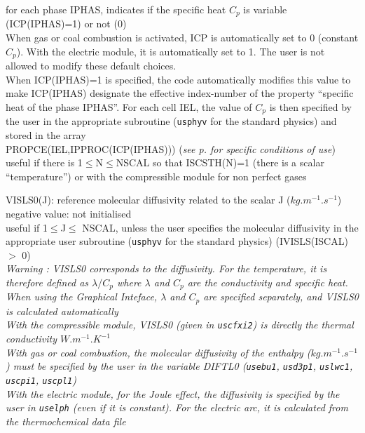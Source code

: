 {for each phase IPHAS, indicates if the specific heat $C_p$ is variable
(ICP(IPHAS)=1) or not (0)\\
When gas or coal combustion is activated, ICP is automatically set to 0
(constant $C_p$). With the electric module, it is automatically set to 1.
The user is not allowed to modify these default choices.\\
When ICP(IPHAS)=1 is specified, the code automatically modifies this value to
make ICP(IPHAS) designate the effective index-number of the property
``specific heat of the phase IPHAS''. For each cell IEL, the value of
$C_p$ is then specified by the user in the appropriate subroutine
(\texttt{usphyv} for the standard physics) and stored in the array\\
PROPCE(IEL,IPPROC(ICP(IPHAS)))
({\em see p.\pageref{prg_propvar} for specific conditions of use})\\
useful if there is 1$\leqslant$N$\leqslant$NSCAL so that ISCSTH(N)=1
(there is a scalar ``temperature'') or with the compressible module for non
perfect gases}

{VISLS0(J): reference molecular diffusivity related to the scalar J
($kg.m^{-1}.s^{-1}$)\\
negative value: not initialised\\
useful if 1$\leqslant$J$\leqslant$ NSCAL, unless the user specifies the
molecular diffusivity in the appropriate user subroutine (\texttt{usphyv} for
the standard physics) (IVISLS(ISCAL) $>$ 0)\\
{\em Warning : VISLS0 corresponds to the diffusivity. For the temperature, it is
therefore defined as $\lambda/C_p$ where $\lambda$ and $C_p$ are the
conductivity and specific heat. When using the Graphical Inteface, $\lambda$ and
$C_p$ are specified separately, and VISLS0 is calculated automatically\\
With the compressible module, VISLS0 (given in \texttt{uscfxi2}) is directly the
thermal conductivity $W.m^{-1}.K^{-1}$\\
With gas or coal combustion, the molecular diffusivity of the enthalpy
($kg.m^{-1}.s^{-1}$) must be specified by the user in the variable DIFTL0 (\texttt{usebu1},
\texttt{usd3p1}, \texttt{uslwc1}, \texttt{uscpi1}, \texttt{uscpl1})\\
With the electric module, for the Joule effect, the diffusivity is specified by
the user in \texttt{uselph} (even if it is constant). For the electric arc, it
is calculated from the thermochemical data file}}

